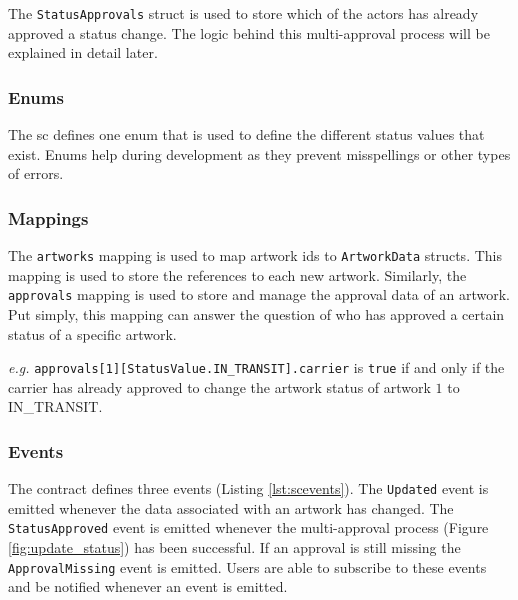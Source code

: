 The \texttt{StatusApprovals} struct is used to store which of the actors has already approved a status change. The logic behind this multi-approval process will be explained in detail later.



\subsubsection{Enums}
The \gls{sc} defines one enum that is used to define the different status values that exist. Enums help during development as they prevent misspellings or other types of errors.



\subsubsection{Mappings}
The \texttt{artworks} mapping is used to map artwork ids to \texttt{ArtworkData} structs. This mapping is used to store the references to each new artwork. Similarly, the \texttt{approvals} mapping is used to store and manage the approval data of an artwork. Put simply, this mapping can answer the question of who has approved a certain status of a specific artwork.



\textit{e.g.} \texttt{approvals[1][StatusValue.IN\_TRANSIT].carrier} is \texttt{true} if and only if the carrier has already approved to change the artwork status of artwork $1$ to IN\_TRANSIT.

\subsubsection{Events}
The contract defines three events (Listing \ref{lst:scevents}). The \texttt{Updated} event is emitted whenever the data associated with an artwork has changed. The \texttt{StatusApproved} event is emitted whenever the multi-approval process (Figure \ref{fig:update_status}) has been successful. If an approval is still missing the \texttt{ApprovalMissing} event is emitted. Users are able to subscribe to these events and be notified whenever an event is emitted.

